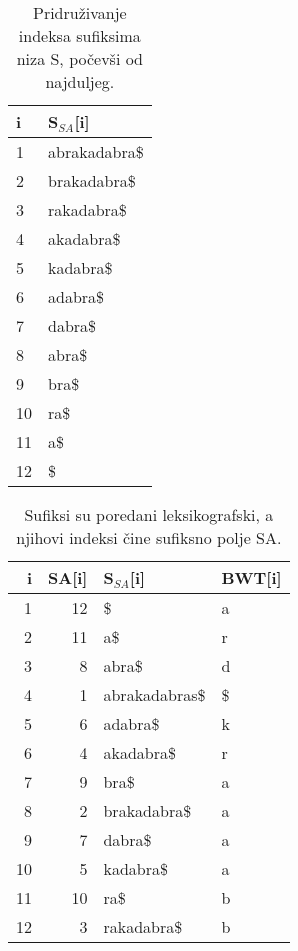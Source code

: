 \documentclass[11pt]{article}
\begin{document}
\begin{table}
	\caption{Pridruživanje indeksa sufiksima niza S, počevši od najduljeg.}
	\label{tablePrimjer1}
	\begin{center}
		\begin{tabular}{ll}
			\toprule
			i & S$_{SA}$[i] \\
			\midrule
			1 & abrakadabra\$ \\
			2 & brakadabra\$ \\
			3 & rakadabra\$ \\
			4 & akadabra\$ \\
			5 & kadabra\$ \\
			6 & adabra\$ \\
			7 & dabra\$ \\
			8 & abra\$ \\
			9 & bra\$ \\
			10 & ra\$ \\
			11 & a\$ \\
			12 & \$ \\
			\bottomrule
		\end{tabular}
	\end{center}
\end{table}

\begin{table}
	\caption{Sufiksi su poredani leksikografski, a njihovi indeksi čine sufiksno polje SA.}
	\label{tablePrimjer2}
	\begin{center}
		\begin{tabular}{rrll}
			\toprule
			i & SA[i] & S$_{SA}$[i] & BWT[i] \\
			\midrule
			1 & 12 & \$ & a\\
			2 & 11 &  a\$ & r \\
			3 & 8 & abra\$ & d \\
			4 & 1 & abrakadabras\$ & \$ \\
			5 & 6 & adabra\$ & k \\
			6 & 4 & akadabra\$ & r \\
			7 & 9 & bra\$ & a\\
			8 & 2 & brakadabra\$ & a\\
			9 & 7 & dabra\$ & a \\
			10 & 5 & kadabra\$ & a\\
			11 & 10 & ra\$ & b \\
			12 & 3 & rakadabra\$ & b\\
			\bottomrule
		\end{tabular}
		
	\end{center}
	
\end{table}
\end{document}
